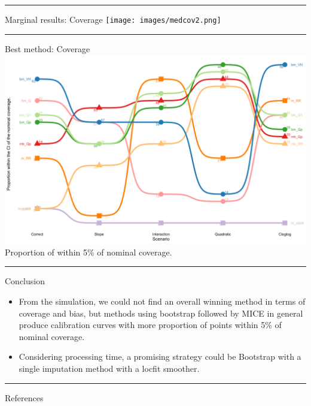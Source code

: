\documentclass[
  letterpaper,
  DIV=11,
  numbers=noendperiod]{scrartcl}
\begin{document}
\begin{center}\rule{0.5\linewidth}{0.5pt}\end{center}

{ Marginal results: Coverage} \texttt{[image: images/medcov2.png]}

\begin{center}\rule{0.5\linewidth}{0.5pt}\end{center}

{ Best method: Coverage} \includegraphics{images/rank.png} Proportion of
within 5\% of nominal coverage.

\begin{center}\rule{0.5\linewidth}{0.5pt}\end{center}

{ Conclusion}

\begin{itemize}
\item
  From the simulation, we could not find an overall winning method in
  terms of coverage and bias, but methods using bootstrap followed by
  MICE in general produce calibration curves with more proportion of
  points within 5\% of nominal coverage.
\item
  Considering processing time, a promising strategy could be Bootstrap
  with a single imputation method with a locfit smoother.
\end{itemize}

\begin{center}\rule{0.5\linewidth}{0.5pt}\end{center}

{ References}
\end{document}
